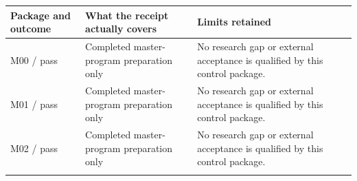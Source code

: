 \documentclass[
  10pt,
]{article}
\begin{document}
\begin{longtable}[]{@{}>{\raggedright\arraybackslash}p{}>{\raggedright\arraybackslash}p{}>{\raggedright\arraybackslash}p{}@{}}
\toprule
\begin{minipage}[b]{\linewidth}\raggedright
Package and outcome\strut
\end{minipage} & \begin{minipage}[b]{\linewidth}\raggedright
What the receipt actually covers\strut
\end{minipage} & \begin{minipage}[b]{\linewidth}\raggedright
Limits retained\strut
\end{minipage}\tabularnewline
\midrule
\endhead
\begin{minipage}[t]{\linewidth}\raggedright
M00 / pass\strut
\end{minipage} & \begin{minipage}[t]{\linewidth}\raggedright
Completed master-program preparation only\strut
\end{minipage} & \begin{minipage}[t]{\linewidth}\raggedright
No research gap or external acceptance is qualified by this control
package.\strut
\end{minipage}\tabularnewline
\begin{minipage}[t]{\linewidth}\raggedright
M01 / pass\strut
\end{minipage} & \begin{minipage}[t]{\linewidth}\raggedright
Completed master-program preparation only\strut
\end{minipage} & \begin{minipage}[t]{\linewidth}\raggedright
No research gap or external acceptance is qualified by this control
package.\strut
\end{minipage}\tabularnewline
\begin{minipage}[t]{\linewidth}\raggedright
M02 / pass\strut
\end{minipage} & \begin{minipage}[t]{\linewidth}\raggedright
Completed master-program preparation only\strut
\end{minipage} & \begin{minipage}[t]{\linewidth}\raggedright
No research gap or external acceptance is qualified by this control
package.\strut
\end{minipage}\tabularnewline
\begin{minipage}[t]{\linewidth}\raggedright

\end{minipage}
\end{longtable}
\end{document}
